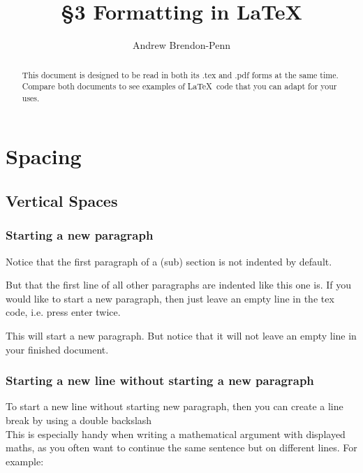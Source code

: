 \documentclass[a4paper,11pt]{article}
\title{\S3 Formatting in \LaTeX }
\author{Andrew Brendon-Penn}
\date{} %
\begin{document}
\maketitle

\begin{abstract}
This document is designed to be read in both its .tex and .pdf forms at the same time. Compare both documents to see examples of \LaTeX \, code that you can adapt for your uses.
\end{abstract}
\pagebreak

\tableofcontents %

\pagebreak


\section{Spacing}
\subsection{Vertical Spaces}

\subsubsection{Starting a new paragraph}

Notice that the first paragraph of a (sub) section is not indented by default.

But that the first line of all other paragraphs are indented like this one is. If you would like to start a new paragraph, then just leave an empty line in the tex code, i.e. press enter twice.

This will start a new paragraph. But notice that it will not leave an empty line in your finished document.


\subsubsection{Starting a new line without starting a new paragraph}

To start a new line without starting new paragraph, then you can create a line break by using a double backslash \\ This is especially handy when writing a mathematical argument with displayed maths, as you often want to continue the same sentence but on different lines. For example:
\end{document}
